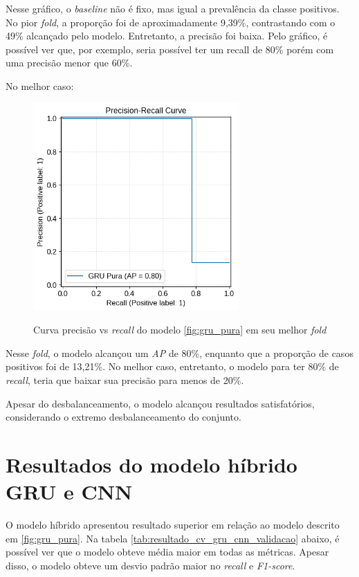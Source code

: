 Nesse gráfico, o \textit{baseline} não é fixo, mas igual a prevalência da classe positivos. No pior \textit{fold}, a proporção foi de aproximadamente
9,39\%, contrastando com o 49\% alcançado pelo modelo. Entretanto, a precisão foi baixa. Pelo gráfico, é possível ver que, por exemplo, seria 
possível ter um recall de 80\% porém com uma precisão menor que 60\%.

No melhor caso:

\begin{figure}[H]
  \centering
  \caption{Curva precisão vs \textit{recall} do modelo \ref{fig:gru_pura} em seu melhor \textit{fold}}
   \includegraphics[width=0.7\textwidth]{figuras/modelos_resultados/gru/ap_gru_melhor_fold.png} %
  \label{fig:ap_gru_melhor_fold}
\end{figure}

Nesse \textit{fold}, o modelo alcançou um \textit{AP} de 80\%, enquanto que a proporção de casos positivos foi de 13,21\%. No melhor caso, 
entretanto, o modelo para ter 80\% de \textit{recall}, teria que baixar sua precisão para menos de 20\%. 

Apesar do desbalanceamento, o modelo alcançou resultados satisfatórios, considerando o extremo desbalanceamento do conjunto.

\section{Resultados do modelo híbrido GRU e CNN}
\label{sec:resultados_gru_cnn}

O modelo híbrido apresentou resultado superior em relação ao modelo descrito em \ref{fig:gru_pura}. Na tabela \ref{tab:resultado_cv_gru_cnn_validacao}
abaixo, é possível ver que o modelo obteve média maior em todas as métricas. Apesar disso, o modelo obteve um desvio padrão maior 
no \textit{recall} e \textit{F1-score}. 

